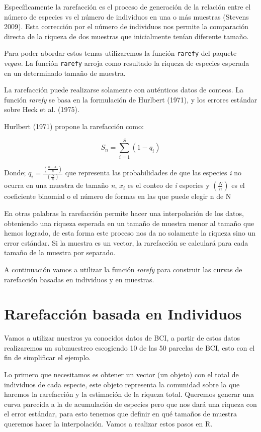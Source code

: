 \documentclass[]{book}
\begin{document}
Específicamente la rarefacción es el proceso de generación de la
relación entre el número de especies vs el número de individuos en una o
más muestras (Stevens 2009). Esta corrección por el número de individuos
nos permite la comparación directa de la riqueza de dos muestras que
inicialmente tenían diferente tamaño.

Para poder abordar estos temas utilizaremos la función \texttt{rarefy}
del paquete \emph{vegan}. La función \texttt{rarefy} arroja como
resultado la riqueza de especies esperada en un determinado tamaño de
muestra.

La rarefacción puede realizarse solamente con auténticos datos de
conteos. La función \emph{rarefy} se basa en la formulación de Hurlbert
(1971), y los errores estándar sobre Heck et al. (1975).

Hurlbert (1971) propone la rarefacción como:

\[S_n= \sum_{i=1}^S (1-q_i)\]

Donde; \(q_i= \frac{(\frac{n-x_i}{n})}{(\frac{N}{n})}\) que representa
las probabilidades de que las especies \emph{i} no ocurra en una muestra
de tamaño \emph{n}, \(x_i\) es el conteo de \emph{i} especies y
\((\frac{N}{n})\) es el coeficiente binomial o el número de formas en
las que puede elegir n de N

En otras palabras la rarefacción permite hacer una interpolación de los
datos, obteniendo una riqueza esperada en un tamaño de muestra menor al
tamaño que hemos logrado, de esta forma este proceso nos da no solamente
la riqueza sino un error estándar. Si la muestra es un vector, la
rarefacción se calculará para cada tamaño de la muestra por separado.

A continuación vamos a utilizar la función \emph{rarefy} para construir
las curvas de rarefacción basadas en individuos y en muestras.

\section{Rarefacción basada en
Individuos}\label{rarefaccion-basada-en-individuos}

Vamos a utilizar nuestros ya conocidos datos de BCI, a partir de estos
datos realizaremos un submuestreo escogiendo 10 de las 50 parcelas de
BCI, esto con el fin de simplificar el ejemplo.

Lo primero que necesitamos es obtener un vector (un objeto) con el total
de individuos de cada especie, este objeto representa la comunidad sobre
la que haremos la rarefacción y la estimación de la riqueza total.
Queremos generar una curva parecida a la de acumulación de especies pero
que nos dará una riqueza con el error estándar, para esto tenemos que
definir en qué tamaños de muestra queremos hacer la interpolación. Vamos
a realizar estos pasos en R.
\end{document}
